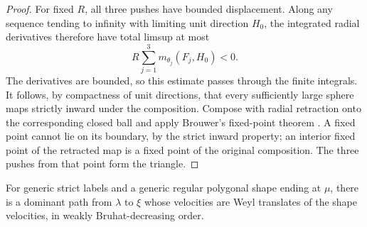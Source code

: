 \begin{proof}
For fixed $R$, all three pushes have bounded displacement.  Along
any sequence tending to infinity with limiting unit direction $H_0$,
the integrated radial derivatives therefore have total limsup at most
\[
 R\sum_{j=1}^3 m_{\theta_j}(F_j,H_0)<0.
\]
The derivatives are bounded, so this estimate passes through the
finite integrals.  It follows, by compactness of unit directions,
that every sufficiently large sphere maps strictly inward under the
composition.  Compose with radial retraction onto the corresponding
closed ball and apply Brouwer's fixed-point theorem \cite{Brouwer1911}.
A fixed point
cannot lie on its boundary, by the strict inward property; an interior
fixed point of the retracted map is a fixed point of the original
composition.  The three pushes from that point form the triangle.
\end{proof}

\begin{lemma}\label{real:decreasing-paths}
For generic strict labels and a generic regular polygonal shape
ending at $\mu$, there is a dominant path from $\lambda$ to $\xi$
whose velocities are Weyl translates of the shape velocities, in
weakly Bruhat-decreasing order.
\end{lemma}

